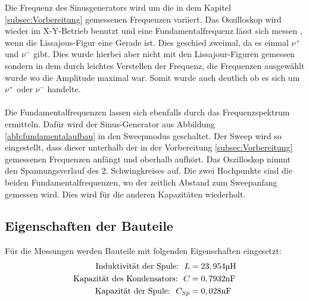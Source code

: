 Die Frequenz des Sinusgenerators wird um
die in dem Kapitel \ref{subsec:Vorbereitung}
gemessenen Frequenzen variiert.
Das Oszilloskop wird wieder im X-Y-Betrieb benutzt
und eine Fundamentalfrequenz lässt sich messen
, wenn die Lissajous-Figur eine Gerade ist.
Dies geschied zweimal, da es einmal $\nu^+$ und
$\nu^-$ gibt. Dies wurde hierbei aber nicht mit den Lissajour-Figuren gemessen
sondern in dem durch leichtes Verstellen der Frequenz, die Frequenzen ausgewählt wurde wo die Amplitude maximal war.
Somit wurde auch deutlich ob es sich um $\nu^+ $ oder $\nu^-$ handelte.   \\
\\
Die Fundamentalfrequenzen lassen sich
ebenfalls durch das Frequenzspektrum ermitteln.
Dafür wird der Sinus-Generator
aus Abbildung \ref{abb:fundamentalaufbau}
in den Sweepmodus geschaltet.
Der Sweep wird so eingestellt, dass dieser unterhalb
der in der Vorbereitung \ref{subsec:Vorbereitung}
gemessenen Frequenzen anfängt
und oberhalb aufhört.
Das Oszilloskop nimmt den Spannungsverlauf des
2. Schwingkreises auf. Die zwei Hochpunkte sind die
beiden Fundamentalfrequenzen, wo der zeitlich
Abstand zum Sweepanfang gemessen wird.
Dies wird  für die anderen Kapazitäten wiederholt.\\

\subsection{Eigenschaften der Bauteile}
Für die Messungen werden Bauteile mit folgenden Eigenschaften eingesetzt:
\begin{align}
\text{Induktivität der Spule:}\ \ L&=23,954\si{\micro\henry} \notag\\
\text{Kapazität des Kondensators:} \ \ C&=0,7932\si{\nano\farad} \notag\\
\text{Kapazität der Spule:} \ \ C_{Sp}&=0,028\si{\nano\farad} \notag\\
\end{align}
